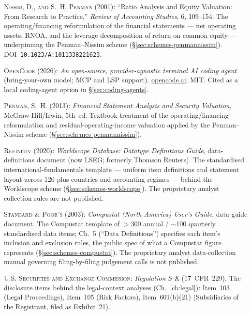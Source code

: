 \documentclass[11pt,a4paper]{report}
\begin{document}
\textsc{Nissim, D., \textsc{and} S.~H. Penman} (2001): ``Ratio Analysis and Equity Valuation: From Research
to Practice,'' \emph{Review of Accounting Studies}, 6, 109--154. The operating/financing reformulation of the
financial statements --- net operating assets, RNOA, and the leverage decomposition of return on common
equity --- underpinning the Penman--Nissim scheme (\S\ref{sec:schemes-penmannissim}).
DOI~\texttt{10.1023/A:1011338221623}.
\par

\textsc{OpenCode} (2026): \emph{An open-source, provider-agnostic terminal AI coding agent} (bring-your-own
model; MCP and LSP support). \href{https://opencode.ai}{opencode.ai}; MIT. Cited as a local coding-agent option
in \S\ref{sec:coding-agents}.
\par

\textsc{Penman, S.~H.} (2013): \emph{Financial Statement Analysis and Security Valuation}, McGraw-Hill/Irwin,
5th~ed. Textbook treatment of the operating/financing reformulation and residual-operating-income valuation
applied by the Penman--Nissim scheme (\S\ref{sec:schemes-penmannissim}).
\par

\textsc{Refinitiv} (2020): \emph{Worldscope Database: Datatype Definitions Guide}, data-definitions document
(now LSEG; formerly Thomson Reuters). The standardised international-fundamentals template --- uniform item
definitions and statement layout across 120-plus countries and accounting regimes --- behind the Worldscope
scheme (\S\ref{sec:schemes-worldscope}). The proprietary analyst collection rules are not published.
\par

\textsc{Standard \& Poor's} (2003): \emph{Compustat (North America) User's Guide}, data-guide document. The
Compustat template of $>$300 annual / $\sim$100 quarterly standardised data items; Ch.~5 (``Data
Definitions'') specifies each item's inclusion and exclusion rules, the public spec of what a Compustat figure
represents (\S\ref{sec:schemes-compustat}). The proprietary analyst data-collection manual governing
filing-by-filing judgement calls is not published.
\par

\textsc{U.S. Securities and Exchange Commission}: \emph{Regulation S-K} (17~CFR~229). The disclosure items
behind the legal-context analyses (Ch.~\ref{ch:legal}): Item~103 (Legal Proceedings), Item~105 (Risk Factors),
Item~601(b)(21) (Subsidiaries of the Registrant, filed as Exhibit~21).
\par

\endgroup
\end{document}
